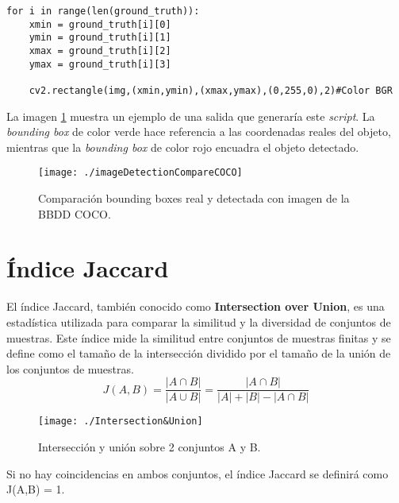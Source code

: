 \documentclass[a4paper, 12pt, spanish, chapterprefix, numbers=noenddot]{book}
\begin{document}
\begin{lstlisting}[frame=single]
for i in range(len(ground_truth)):
	xmin = ground_truth[i][0]
	ymin = ground_truth[i][1]
	xmax = ground_truth[i][2]
	ymax = ground_truth[i][3]

	cv2.rectangle(img,(xmin,ymin),(xmax,ymax),(0,255,0),2)#Color BGR
\end{lstlisting}

La imagen \ref{DetectionCompareCOCO} muestra un ejemplo de una salida que generaría este \textit{script}. La \textit{bounding box} de color verde hace referencia a las coordenadas reales del objeto, mientras que la \textit{bounding box} de color rojo encuadra el objeto detectado.

\begin{figure}[H]
\begin{center}
\texttt{[image: ./imageDetectionCompareCOCO]}
\caption{Comparación bounding boxes real y detectada con imagen de la BBDD COCO.}
\label{DetectionCompareCOCO}
\end{center}
\end{figure}

\section{Índice Jaccard}

El índice Jaccard, también conocido como \textbf{Intersection over Union}, es una estadística utilizada para comparar la similitud y la diversidad de conjuntos de muestras. Este índice mide la similitud entre conjuntos de muestras finitas y se define como el tamaño de la intersección dividido por el tamaño de la unión de los conjuntos de muestras.\\

\begin{equation}
J(A,B) = \frac{|A\cap B|}{|A\cup B|} = \frac{|A\cap B|}{|A| + |B| - |A\cap B|}
\end{equation}

\begin{figure}[H]
\begin{center}
\texttt{[image: ./Intersection\&Union]}
\caption{Intersección y unión sobre 2 conjuntos A y B.}
\end{center}
\end{figure}

Si no hay coincidencias en ambos conjuntos, el índice Jaccard se definirá como J(A,B) = 1.
\end{document}
